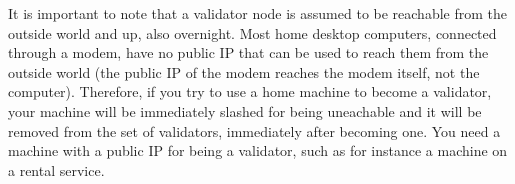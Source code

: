 \begin{commentbox}
It is important to note that a validator node is assumed to be reachable from the outside world
and up, also overnight. Most home desktop computers, connected through a modem, have no public IP
that can be used to reach them from the outside world (the public IP of the modem reaches the modem
itself, not the computer). Therefore, if you try to use a home machine to become a validator, your
machine will be immediately slashed for being uneachable and it will be removed from the set of validators,
immediately after becoming one. You need a machine with a public IP for being a validator, such as
for instance a machine on a rental service.
\end{commentbox}